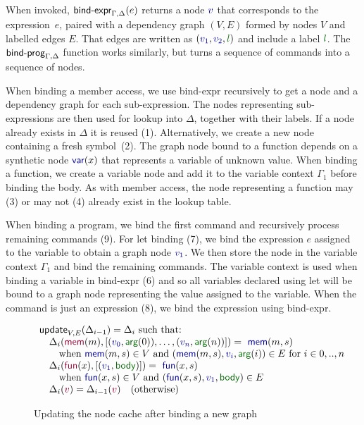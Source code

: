 \documentclass[english,crc,references=cleveref]{programming}
\theoremstyle{plain}
\theoremstyle{definition}
\newcommand{\ident}[1]{\textnormal{\textcolor{idclr}{\sffamily #1}}}
\newcommand{\kvd}[1]{\textnormal{\textcolor{kvdclr}{\sffamily #1}}}
\newcommand{\bndclr}[1]{\textcolor{kvdclr}{#1}}
\newcommand{\bkndclr}[1]{\textcolor{prepclr}{#1}}
\newcommand{\blblclr}[1]{\textcolor{numclr}{#1}}
\newcommand{\bnd}[1]{\textnormal{\textcolor{kvdclr}{\sffamily #1}}}
\newcommand{\bknd}[1]{\textnormal{\textcolor{prepclr}{\sffamily #1}}}
\newcommand{\blbl}[1]{\textnormal{\textcolor{numclr}{\sffamily #1}}}
\begin{document}
When invoked, $\ident{bind-expr}_{\Gamma,\Delta}(e)$ returns a node $\bndclr{v}$ that corresponds
to the expression~$e$, paired with a dependency graph $(V, E)$ formed by nodes $V$ and labelled
edges $E$. That edges are written as $(\bndclr{v_1}, \bndclr{v_2}, \blblclr{l})$ and include a
label $\blblclr{l}$. The $\ident{bind-prog}_{\Gamma,\Delta}$ function works similarly, but turns
a sequence of commands into a sequence of nodes.

When binding a member access, we use \ident{bind-expr} recursively
to get a node and a dependency graph for each sub-expression. The nodes representing sub-expressions are
then used for lookup into $\Delta$, together with their labels. If a node already
exists in $\Delta$ it is reused (1). Alternatively, we create a new node containing a fresh symbol~(2).
%
The graph node bound to a function depends on a synthetic node $\bnd{var}(x)$ that represents a
variable of unknown value. When binding a function, we create a variable node and add it
to the variable context $\Gamma_1$ before binding the body. As with member access, the node
representing a function may (3) or may not (4) already exist in the lookup table.

When binding a program, we bind the first command and
recursively process remaining commands (9). For \kvd{let} binding (7), we bind the expression $e$
assigned to the variable to obtain a graph node $\bndclr{v_1}$. We then store the node in the
variable context $\Gamma_1$ and bind the remaining commands. The variable context is used
when binding a variable in \ident{bind-expr} (6) and so all variables declared using \kvd{let}
will be bound to a graph node representing the value assigned to the variable. When the command
is just an expression (8), we bind the expression using \ident{bind-expr}.


\begin{figure}
%
\begin{equation*}
\begin{array}{l}
\ident{update}_{V,E}(\Delta_{i-1}) = \Delta_i~\textnormal{such that:}
\\
\quad\Delta_{i}(\bknd{mem}(m), [(\bndclr{v_0},\blbl{arg}(0)),\ldots, (\bndclr{v_n},\blbl{arg}(n))]) = \bnd{mem}(m, s)\\
\quad\quad \textnormal{when}~\bnd{mem}(m, s) \in V
~\textnormal{and}~(\bnd{mem}(m, s), \bndclr{v_i}, \blbl{arg}(i)) \in E~\textnormal{for}~i\in 0,..,n
\\
\quad\Delta_{i}(\bknd{fun}(x), [(\bndclr{v_1},\blbl{body})]) = \bnd{fun}(x, s)\\
\quad\quad \textnormal{when}~\bnd{fun}(x, s) \in V
~\textnormal{and}~(\bnd{fun}(x, s), \bndclr{v_1}, \blbl{body}) \in E
\\
\quad\Delta_{i}(\bkndclr{v}) = \Delta_{i-1}(\bkndclr{v})\quad \textnormal{(otherwise)}
\end{array}
\end{equation*}
%
\caption{Updating the node cache after binding a new graph}
\label{fig:loop}
%
\end{figure}
\end{document}
